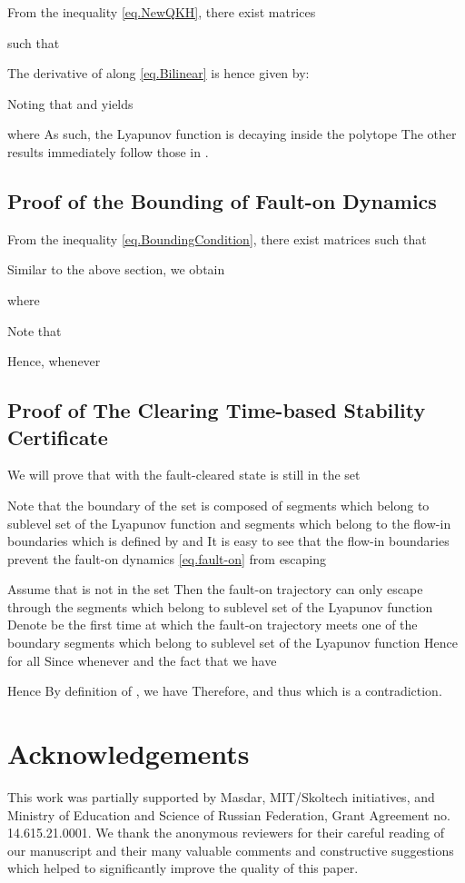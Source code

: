 \documentclass[final]{IEEEtran}
\begin{document}
From  the inequality \eqref{eq.NewQKH}, there exist matrices

  such that

The derivative of  along \eqref{eq.Bilinear} is hence given
by:

Noting that  and  yields

where
 As such, the Lyapunov function
 is decaying inside the polytope  The other
results immediately follow those in \cite{Vu:2014}.



\subsection{Proof of the Bounding of Fault-on Dynamics}
\label{appendix.BoundingCondition}

From  the inequality \eqref{eq.BoundingCondition}, there exist
matrices 
  such that

Similar to the above section, we obtain

where


 Note that


Hence,  whenever 


\subsection{Proof of The Clearing Time-based Stability Certificate}
\label{appendix.ClearingTimeCertificate} We will prove that with
 the fault-cleared
state  is still in the set 

Note that the boundary of the set  is composed of
segments which belong to sublevel set of the Lyapunov function
 and segments which belong to the flow-in boundaries
 which is defined by
 and  It is
easy to see that the flow-in boundaries
 prevent the fault-on dynamics
\eqref{eq.fault-on} from escaping 

Assume that  is not in the set
 Then the fault-on trajectory can only escape
 through the segments which belong to sublevel set
of the Lyapunov function  Denote  be the first time
at which the fault-on trajectory meets one of the boundary
segments which belong to sublevel set of the Lyapunov function
 Hence  for all  Since  whenever  and the fact that  we have


Hence  By
definition of , we have  Therefore,
 and thus
 which is a
contradiction.

\section{Acknowledgements}
This work was partially supported by  Masdar, MIT/Skoltech
initiatives, and Ministry of Education and Science of Russian
Federation, Grant Agreement no. 14.615.21.0001. We thank the
anonymous reviewers for their careful reading of our manuscript
and their many valuable comments and constructive suggestions
which helped to significantly improve the quality of this paper.



\end{document}
